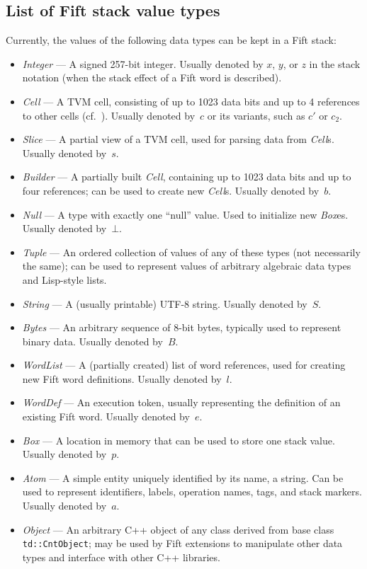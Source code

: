 \documentclass[12pt,oneside]{article}
\def\mysubsection#1{\subsection{#1}\fancyhead[C]{\small{\textsc{\textrm{\thesubsection.} #1}}}}
\begin{document}
\mysubsection{List of Fift stack value types}\label{p:stack.types}
Currently, the values of the following data types can be kept in a Fift stack:
\begin{itemize}
\item {\em Integer\/} --- A signed 257-bit integer. Usually denoted by $x$, $y$, or $z$ in the stack notation (when the stack effect of a Fift word is described).
\item {\em Cell\/} --- A TVM cell, consisting of up to 1023 data bits and up to 4 references to other cells (cf.~\cite{TVM}). Usually denoted by~$c$ or its variants, such as $c'$ or $c_2$.
\item {\em Slice\/} --- A partial view of a TVM cell, used for parsing data from {\em Cell\/}s. Usually denoted by~$s$.
\item {\em Builder\/} --- A partially built {\em Cell}, containing up to 1023 data bits and up to four references; can be used to create new {\em Cell\/}s. Usually denoted by~$b$.
\item {\em Null\/} --- A type with exactly one ``null'' value. Used to initialize new {\em Box\/}es. Usually denoted by~$\bot$.
\item {\em Tuple\/} --- An ordered collection of values of any of these types (not necessarily the same); can be used to represent values of arbitrary algebraic data types and Lisp-style lists.
\item {\em String\/} --- A (usually printable) UTF-8 string. Usually denoted by~$S$.
\item {\em Bytes\/} --- An arbitrary sequence of 8-bit bytes, typically used to represent binary data. Usually denoted by~$B$.
\item {\em WordList\/} --- A (partially created) list of word references, used for creating new Fift word definitions. Usually denoted by~$l$.
\item {\em WordDef\/} --- An execution token, usually representing the definition of an existing Fift word. Usually denoted by~$e$.
\item {\em Box\/} --- A location in memory that can be used to store one stack value. Usually denoted by~$p$.
\item {\em Atom\/} --- A simple entity uniquely identified by its name, a string. Can be used to represent identifiers, labels, operation names, tags, and stack markers. Usually denoted by~$a$.
\item {\em Object\/} --- An arbitrary C++ object of any class derived from base class {\tt td::CntObject}; may be used by Fift extensions to manipulate other data types and interface with other C++ libraries.
\end{itemize}
\end{document}
